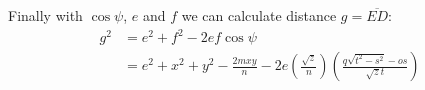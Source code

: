 \documentclass[11pt]{article}
\begin{document}
Finally with $\cos\psi$, $e$ and $f$ we can calculate distance $g = \overline{ED}$:
\begin{align}
g^2 &= e^2 + f^2 - 2ef\cos\psi\\
 &= e^2 + x^2 + y^2 - \frac{2mxy}{n} 
 - 2e\left(\frac{\sqrt{z}}{n}\right)\left(\frac{q\sqrt{t^2-s^2} - os}{\sqrt{z}t}\right)\\
\end{align}

%
%
%
%
\end{document}
